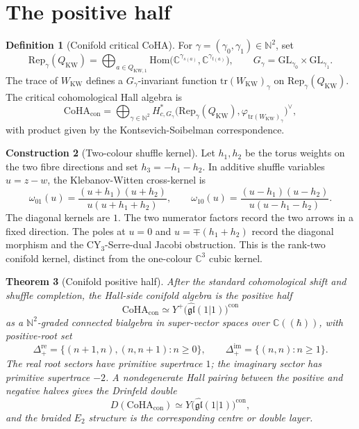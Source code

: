 \documentclass[11pt]{amsart}
\providecommand{\C}{\mathbb{C}}
\providecommand{\Rep}{\mathrm{Rep}}
\providecommand{\Etwo}{E_2}
\providecommand{\CoHA}{\mathrm{CoHA}}
\providecommand{\tr}{\mathrm{tr}}
\theoremstyle{plain}
\newtheorem{theorem}{Theorem}[section]
\theoremstyle{definition}
\newtheorem{definition}[theorem]{Definition}
\newtheorem{construction}[theorem]{Construction}
\theoremstyle{remark}
\begin{document}
\section{The positive half}

\begin{definition}[Conifold critical CoHA]\label{def:conifold-coha}
For \(\gamma=(\gamma_0,\gamma_1)\in\mathbb{N}^2\), set
\[
  \Rep_\gamma(Q_{\mathrm{KW}})
  =
  \bigoplus_{a\in Q_{\mathrm{KW},1}}
  \mathrm{Hom}\bigl(\C^{\gamma_{s(a)}},\C^{\gamma_{t(a)}}\bigr),
  \qquad
  G_\gamma=\mathrm{GL}_{\gamma_0}\times\mathrm{GL}_{\gamma_1}.
\]
The trace of \(W_{\mathrm{KW}}\) defines a \(G_\gamma\)-invariant
function \(\tr(W_{\mathrm{KW}})_\gamma\) on \(\Rep_\gamma(Q_{\mathrm{KW}})\).
The critical cohomological Hall algebra is
\[
  \CoHA_{\mathrm{con}}
  =
  \bigoplus_{\gamma\in\mathbb{N}^2}
  H^{*}_{c,G_\gamma}
  \bigl(\Rep_\gamma(Q_{\mathrm{KW}}),
  \varphi_{\tr(W_{\mathrm{KW}})_\gamma}\bigr)^\vee ,
\]
with product given by the Kontsevich-Soibelman correspondence.
\end{definition}

\begin{construction}[Two-colour shuffle kernel]\label{cons:conifold-shuffle-kernel}
Let \(h_1,h_2\) be the torus weights on the two fibre directions and set
\(h_3=-h_1-h_2\).  In additive shuffle variables \(u=z-w\), the
Klebanov-Witten cross-kernel is
\[
  \omega_{01}(u)=
  \frac{(u+h_1)(u+h_2)}
       {u(u+h_1+h_2)},
  \qquad
  \omega_{10}(u)=
  \frac{(u-h_1)(u-h_2)}
       {u(u-h_1-h_2)} .
\]
The diagonal kernels are \(1\).  The two numerator factors record the
two arrows in a fixed direction.  The poles at \(u=0\) and
\(u=\mp(h_1+h_2)\) record the diagonal morphism and the
CY\(_3\)-Serre-dual Jacobi obstruction.  This is the rank-two
conifold kernel, distinct from the one-colour \(\C^3\) cubic kernel.
\end{construction}

\begin{theorem}[Conifold positive half]\label{thm:conifold-positive-half}
After the standard cohomological shift and shuffle completion, the
Hall-side conifold algebra is the positive half
\[
  \CoHA_{\mathrm{con}}
  \simeq
  Y^+\!\bigl(\widehat{\mathfrak{gl}}(1|1)\bigr)^{\mathrm{con}}
\]
as a \(\mathbb{N}^2\)-graded connected bialgebra in super-vector spaces
over \(\C((\hbar))\), with positive-root set
\[
  \Delta_+^{\mathrm{re}}
  =
  \{(n+1,n),(n,n+1):n\geq 0\},\qquad
  \Delta_+^{\mathrm{im}}=\{(n,n):n\geq 1\}.
\]
The real root sectors have primitive supertrace \(1\); the imaginary
sector has primitive supertrace \(-2\).  A nondegenerate Hall pairing
between the positive and negative halves gives the Drinfeld double
\[
  D(\CoHA_{\mathrm{con}})
  \simeq
  Y\!\bigl(\widehat{\mathfrak{gl}}(1|1)\bigr)^{\mathrm{con}},
\]
and the braided \(\Etwo\) structure is the corresponding centre or
double layer.
\end{theorem}
\end{document}
